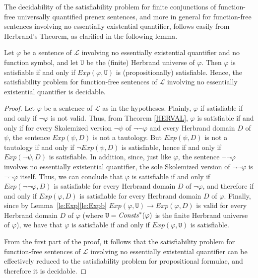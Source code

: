 \documentclass[manyauthors]{fundam}
\newcommand{\Lang}{\ensuremath{\mathcal{L}\xspace}} %
\newcommand{\Univ}{\mathtt{U}}
\newcommand{\HExp}{Exp}
\begin{document}
The decidability of the satisfiability problem for finite conjunctions
of function-free universally quantified prenex sentences, and more in 
general for function-free sentences involving no essentially 
existential quantifier,
follows easily from Herbrand's Theorem, as clarified in the following lemma.
%
\begin{lemma}\label{HERSAT}
Let $\varphi$ be a sentence of $\Lang$ involving no essentially 
existential quantifier and no function symbol, and let $\Univ$ be the 
(finite) Herbrand universe of $\varphi$. Then $\varphi$ is 
satisfiable if and only if $\HExp(\varphi, \Univ)$ is 
(propositionally) satisfiable. Hence, the satisfiability problem for 
function-free sentences of $\Lang$ involving no essentially 
existential quantifier is decidable.
\end{lemma}
\begin{proof}
Let $\varphi$ be a sentence of $\Lang$ as in the hypotheses. Plainly, 
$\varphi$ if satisfiable if and only if $\neg \varphi$ is not valid. 
Thus, from Theorem \ref{HERVAL}, $\varphi$ is satisfiable if and only 
if for every Skolemized version $\neg \psi$ of $\neg \neg \varphi$ 
and every Herbrand domain $D$ of $\psi$, the sentence $\HExp(\psi, 
D)$ is not a tautology. But $\HExp(\psi, D)$ is not a tautology if 
and only if $\neg \HExp(\psi, D)$ is satisfiable, hence if and only 
if $\HExp(\neg \psi, D)$ is satisfiable. In addition, since, just 
like $\varphi$, the sentence $\neg \neg \varphi$ involves no 
essentially existential quantifier, the sole Skolemized version of 
$\neg \neg \varphi$ is $\neg \neg \varphi$ itself. Thus, we can 
conclude that $\varphi$ is satisfiable if and only if $\HExp(\neg 
\neg \varphi, D)$ is satisfiable for every Herbrand domain $D$ of 
$\neg \varphi$, and therefore if and only if $\HExp(\varphi, D)$ is 
satisfiable for every Herbrand domain $D$ of $\varphi$. Finally, 
since by Lemma~\ref{le:Exp}\ref{le:Expb} $\HExp(\varphi, \Univ) 
\rightarrow \HExp(\varphi, D)$ is valid for every Herbrand domain $D$ 
of $\varphi$ (where $\Univ = \Consts^*(\varphi)$ is the finite 
Herbrand universe of $\varphi$), we have that $\varphi$ is 
satisfiable if and only if $\HExp(\varphi, \Univ)$ is satisfiable.

 From the first part of the proof, it follows that the satisfiability 
problem for function-free sentences of $\Lang$ involving no 
essentially existential quantifier can be effectively reduced to the 
satisfiability problem for propositional formulae, and therefore it 
is decidable.
\end{proof}
\end{document}
